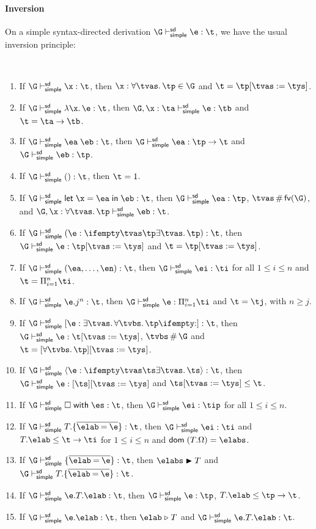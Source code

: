 \documentclass[acmsmall,screen,nonacm%
\Anonymous{,anonymous}{}%
\Final{}{,review}%
]{acmart}
\begin{document}
\paragraph{Inversion} On a simple syntax-directed derivation $\G \thsimplesd \e : \t$, we have the usual inversion
principle:
\begin{lemma}
  \label{lem:simple-inversion-sd}
  ~
  \begin{enumerate}[(\roman*)]
    \item If $\G \thsimplesd \x : \t$, then $\x : \tfor \tvs \tp \in \G$ and $\t = \tp\where{\tvs \is \tys}$.
    \item If $\G \thsimplesd \efun \x \e : \t$, then $\G, \x : \ta \thsimplesd \e : \tb$ and $\t = \ta \to \tb$.
    \item If $\G \thsimplesd \eapp \ea \eb : \t$, then $\G \thsimplesd \ea : \tp \to \t$ and $\G \thsimplesd \eb : \tp$.
    \item If $\G \thsimplesd \eunit : \t$, then $\t = \tunit$.
    \item If $\G \thsimplesd \elet \x \ea \eb : \t$, then $\G \thsimplesd \ea : \tp$, $\tvs \disjoint \fvs \G$, and $\G, \x : \tfor \tvs \tp \thsimplesd \eb : \t$.
    \item If $\G \thsimplesd \eannot \e \tvs \tp : \t$, then $\G \thsimplesd \e : \tp\where{\tvs \is \tys}$ and $\t = \tp\where{\tvs \is \tys}$.
   \item If $\G \thsimplesd \etuple {\ea, \ldots, \en} : \t$, then $\G \thsimplesd \ei : \ti$ for all $1 \leq i \leq n$ and $\t = \tProd \ti$.
    \item If $\G \thsimplesd \exproj \e j n : \t$, then $\G \thsimplesd \e : \tProd \ti$ and $\t = \tj$, with $n \geq j$.
    \item If $\G \thsimplesd \expoly \e \tvs {\tfor \tvbs \tp} : \t$, then $\G \thsimplesd \e : \t\where{\tvs \is \tys}$, $\tvbs \disjoint \G$ and
      $\t = \tpoly {\tfor \tvbs \tp}\where{\tvs \is \tys}$.
    \item If $\G \thsimplesd \exinst \e \tvs \ts : \t$, then $\G \thsimplesd \e : \tpoly \ts\where{\tvs \is \tys}$ and $\ts\where{\tvs \is \tys} \leq \t$.
    \item If $\G \thsimplesd \emagic \es : \t$, then $\G \thsimplesd \ei : \tip$ for all $1 \leq i \leq n$.
    \item If $\G \thsimplesd \exrecord \T {\overline{\elab = \e}} : \t$, then $\G \thsimplesd \ei : \ti$ and ${\labfrom \elab \T} \leq \t \to \ti$ for $1 \leq i \leq n$ and $\Dom {\labfrom \labenv \T} = \elabs$.
    \item If $\G \thsimplesd \erecord {\overline{\elab = \e}} : \t$, then $\labsuni \elabs \T$ and $\G \thsimplesd \exrecord \T {\overline{\elab = \e}} : \t$.
    \item If $\G \thsimplesd \exfield \e \T \elab : \t$, then $\G \thsimplesd \e : \tp$, ${\labfrom \elab \T} \leq \tp \to \t$.
    \item If $\G \thsimplesd \efield \e \elab : \t$, then $\labuni \elab \T$ and $\G \thsimplesd \exfield \e \T \elab : \t$.
  \end{enumerate}
\end{lemma}
\end{document}
